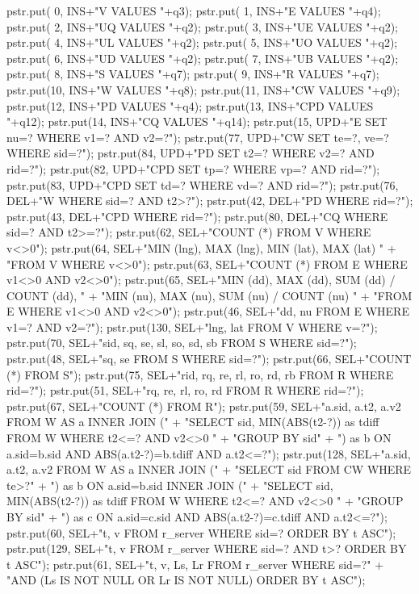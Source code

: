 \documentclass{article}
\theoremstyle{definition}
\begin{document}
  pstr.put( 0, INS+"V VALUES "+q3);
  pstr.put( 1, INS+"E VALUES "+q4);
  pstr.put( 2, INS+"UQ VALUES "+q2);
  pstr.put( 3, INS+"UE VALUES "+q2);
  pstr.put( 4, INS+"UL VALUES "+q2);
  pstr.put( 5, INS+"UO VALUES "+q2);
  pstr.put( 6, INS+"UD VALUES "+q2);
  pstr.put( 7, INS+"UB VALUES "+q2);
  pstr.put( 8, INS+"S VALUES "+q7);
  pstr.put( 9, INS+"R VALUES "+q7);
  pstr.put(10, INS+"W VALUES "+q8);
  pstr.put(11, INS+"CW VALUES "+q9);
  pstr.put(12, INS+"PD VALUES "+q4);
  pstr.put(13, INS+"CPD VALUES "+q12);
  pstr.put(14, INS+"CQ VALUES "+q14);
  pstr.put(15, UPD+"E SET nu=? WHERE v1=? AND v2=?");
  pstr.put(77, UPD+"CW SET te=?, ve=? WHERE sid=?");
  pstr.put(84, UPD+"PD SET t2=? WHERE v2=? AND rid=?");
  pstr.put(82, UPD+"CPD SET tp=? WHERE vp=? AND rid=?");
  pstr.put(83, UPD+"CPD SET td=? WHERE vd=? AND rid=?");
  pstr.put(76, DEL+"W WHERE sid=? AND t2>?");
  pstr.put(42, DEL+"PD WHERE rid=?");
  pstr.put(43, DEL+"CPD WHERE rid=?");
  pstr.put(80, DEL+"CQ WHERE sid=? AND t2>=?");
  pstr.put(62, SEL+"COUNT (*) FROM V WHERE v<>0");
  pstr.put(64, SEL+"MIN (lng), MAX (lng), MIN (lat), MAX (lat) "
      + "FROM V WHERE v<>0");
  pstr.put(63, SEL+"COUNT (*) FROM E WHERE v1<>0 AND v2<>0");
  pstr.put(65, SEL+"MIN (dd), MAX (dd), SUM (dd) / COUNT (dd), "
      + "MIN (nu), MAX (nu), SUM (nu) / COUNT (nu) "
      + "FROM E WHERE v1<>0 AND v2<>0");
  pstr.put(46, SEL+"dd, nu FROM E WHERE v1=? AND v2=?");
  pstr.put(130, SEL+"lng, lat FROM V WHERE v=?");
  pstr.put(70, SEL+"sid, sq, se, sl, so, sd, sb FROM S WHERE sid=?");
  pstr.put(48, SEL+"sq, se FROM S WHERE sid=?");
  pstr.put(66, SEL+"COUNT (*) FROM S");
  pstr.put(75, SEL+"rid, rq, re, rl, ro, rd, rb FROM R WHERE rid=?");
  pstr.put(51, SEL+"rq, re, rl, ro, rd FROM R WHERE rid=?");
  pstr.put(67, SEL+"COUNT (*) FROM R");
  pstr.put(59, SEL+"a.sid, a.t2, a.v2 FROM W AS a INNER JOIN ("
      + "SELECT sid, MIN(ABS(t2-?)) as tdiff FROM W WHERE t2<=? AND v2<>0 "
      + "GROUP BY sid"
      + ") as b ON a.sid=b.sid AND ABS(a.t2-?)=b.tdiff AND a.t2<=?");
  pstr.put(128, SEL+"a.sid, a.t2, a.v2 FROM W AS a INNER JOIN ("
      + "SELECT sid FROM CW WHERE te>?"
      + ") as b ON a.sid=b.sid INNER JOIN ("
      + "SELECT sid, MIN(ABS(t2-?)) as tdiff FROM W WHERE t2<=? AND v2<>0 "
      + "GROUP BY sid"
      + ") as c ON a.sid=c.sid AND ABS(a.t2-?)=c.tdiff AND a.t2<=?");
  pstr.put(60, SEL+"t, v FROM r_server WHERE sid=? ORDER BY t ASC");
  pstr.put(129, SEL+"t, v FROM r_server WHERE sid=? AND t>? ORDER BY t ASC");
  pstr.put(61, SEL+"t, v, Ls, Lr FROM r_server WHERE sid=?"
      + "AND (Ls IS NOT NULL OR Lr IS NOT NULL) ORDER BY t ASC");
\end{document}
